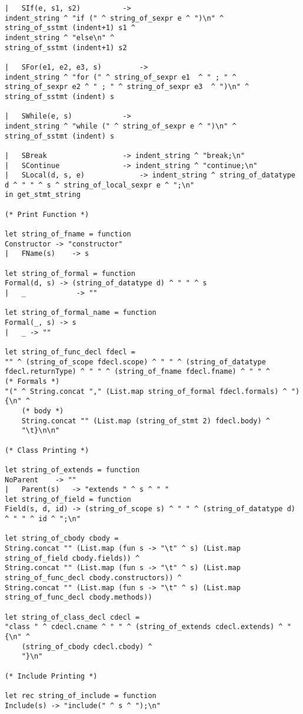 \begin{verbatim}
| 	SIf(e, s1, s2) 			-> 
indent_string ^ "if (" ^ string_of_sexpr e ^ ")\n" ^ 
string_of_sstmt (indent+1) s1 ^ 
indent_string ^ "else\n" ^ 
string_of_sstmt (indent+1) s2

| 	SFor(e1, e2, e3, s) 		-> 
indent_string ^ "for (" ^ string_of_sexpr e1  ^ " ; " ^ string_of_sexpr e2 ^ " ; " ^ string_of_sexpr e3  ^ ")\n" ^ 
string_of_sstmt (indent) s

| 	SWhile(e, s) 			-> 
indent_string ^ "while (" ^ string_of_sexpr e ^ ")\n" ^ 
string_of_sstmt (indent) s

|  	SBreak					-> indent_string ^ "break;\n"
|  	SContinue				-> indent_string ^ "continue;\n"
|   SLocal(d, s, e) 			-> indent_string ^ string_of_datatype d ^ " " ^ s ^ string_of_local_sexpr e ^ ";\n"
in get_stmt_string

(* Print Function *)

let string_of_fname = function 
Constructor -> "constructor"
|	FName(s)	-> s

let string_of_formal = function
Formal(d, s) -> (string_of_datatype d) ^ " " ^ s
|  	_ 			 -> ""

let string_of_formal_name = function
Formal(_, s) -> s
| 	_ -> ""

let string_of_func_decl fdecl =
"" ^ (string_of_scope fdecl.scope) ^ " " ^ (string_of_datatype fdecl.returnType) ^ " " ^ (string_of_fname fdecl.fname) ^ " " ^ 
(* Formals *)
"(" ^ String.concat "," (List.map string_of_formal fdecl.formals) ^ ") {\n" ^
	(* body *)
	String.concat "" (List.map (string_of_stmt 2) fdecl.body) ^
	"\t}\n\n"

(* Class Printing *)

let string_of_extends = function 
NoParent	-> ""
| 	Parent(s)	-> "extends " ^ s ^ " " 
let string_of_field = function 
Field(s, d, id) -> (string_of_scope s) ^ " " ^ (string_of_datatype d) ^ " " ^ id ^ ";\n"

let string_of_cbody cbody = 
String.concat "" (List.map (fun s -> "\t" ^ s) (List.map string_of_field cbody.fields)) ^
String.concat "" (List.map (fun s -> "\t" ^ s) (List.map string_of_func_decl cbody.constructors)) ^
String.concat "" (List.map (fun s -> "\t" ^ s) (List.map string_of_func_decl cbody.methods))

let string_of_class_decl cdecl = 
"class " ^ cdecl.cname ^ " " ^ (string_of_extends cdecl.extends) ^ "{\n" ^
	(string_of_cbody cdecl.cbody) ^
	"}\n"

(* Include Printing *)

let rec string_of_include = function 
Include(s) -> "include(" ^ s ^ ");\n"


\end{verbatim}
